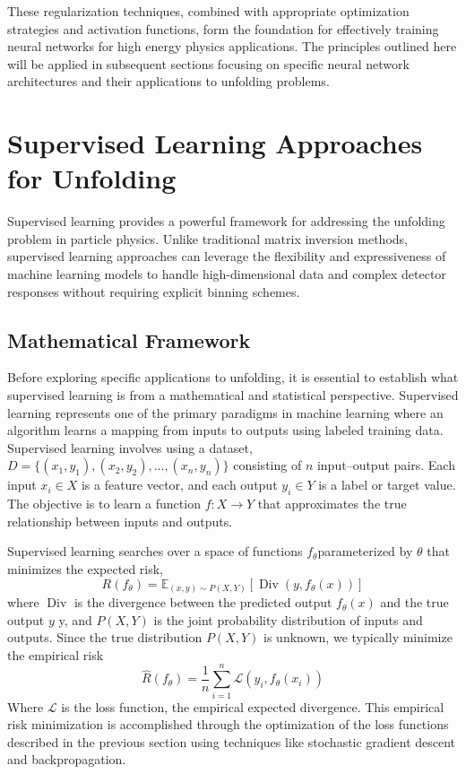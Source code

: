         These regularization techniques, combined with appropriate optimization strategies and activation functions, form the foundation for effectively training neural networks for high energy physics applications.
        The principles outlined here will be applied in subsequent sections focusing on specific neural network architectures and their applications to unfolding problems.
\section{Supervised Learning Approaches for Unfolding}
    Supervised learning provides a powerful framework for addressing the unfolding problem in particle physics. 
    Unlike traditional matrix inversion methods, supervised learning approaches can leverage the flexibility and expressiveness of machine learning models to handle high-dimensional data and complex detector responses without requiring explicit binning schemes.
    \subsection{Mathematical Framework}
        Before exploring specific applications to unfolding, it is essential to establish what supervised learning is from a mathematical and statistical perspective.
        Supervised learning represents one of the primary paradigms in machine learning where an algorithm learns a mapping from inputs to outputs using labeled training data.
        Supervised learning involves using a dataset, \({D} = \{(x_1, y_1), (x_2, y_2), \ldots, (x_n, y_n)\}\) consisting of \(n\) input--output pairs.
        Each input \(x_i \in {X}\) is a feature vector, and each output \(y_i \in {Y}\) is a label or target value.
        The objective is to learn a function \(f: {X} \rightarrow {Y}\) that approximates the true relationship between inputs and outputs.
    
        Supervised learning searches over a space of functions \(f_\theta\)parameterized by \(\theta\) that minimizes the expected risk,
        \begin{equation}{R}(f_\theta) = \mathbb{E}_{(x,y) \sim P(X,Y)}[\operatorname{Div}(y, f_\theta(x))]
        \end{equation}
        where \(\operatorname{Div}\) is the divergence between the predicted output \(f_\theta(x)\) and the true output \(y\) y, and \(P(X,Y)\) is the joint probability distribution of inputs and outputs.
        Since the true distribution \(P(X,Y)\) is unknown, we typically minimize the empirical risk
        \begin{equation}
        \hat{{R}}(f_\theta) = \frac{1}{n}\sum_{i=1}^{n}\mathcal{L}(y_i, f_\theta(x_i))
        \end{equation}
        Where \(\mathcal{L}\) is the loss function, the empirical expected divergence.
        This empirical risk minimization is accomplished through the optimization of the loss functions described in the previous section using techniques like stochastic gradient descent and backpropagation.
